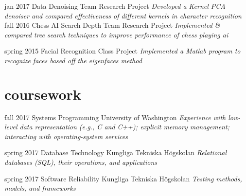 \documentclass[]{friggeri-cv}
\begin{document}
\begin{entrylist}
  \entry
    {jan 2017}
    {Data Denoising}
    {Team Research Project}
    {\emph{Developed a Kernel PCA denoiser and compared effectiveness of different kernels in character recognition}}
  \entry
    {fall 2016}
    {Chess AI Search Depth}
    {Team Research Project}
    {\emph{Implemented \& compared tree search techniques to improve performance of chess playing ai}}

  \entry
    {spring 2015}
    {Facial Recognition}
    {Class Project}
    {\emph{Implemented a Matlab program to recognize faces based off the eigenfaces method}}
\end{entrylist}

\section{coursework}

\begin{entrylist}

  \entry
    {fall 2017}
    {Systems Programming}
    {University of Washington}
    {\emph{Experience with low-level data representation (e.g., C and C++); explicit memory management; interacting with operating-system services}}


  \entry
    {spring 2017}
    {Database Technology}
    {Kungliga Tekniska Högskolan}
    {\emph{Relational databases (SQL), their operations, and applications}}

  \entry
    {spring 2017}
    {Software Reliability}
    {Kungliga Tekniska Högskolan}
    {\emph{Testing methods, models, and frameworks}}



\end{entrylist}
\end{document}
